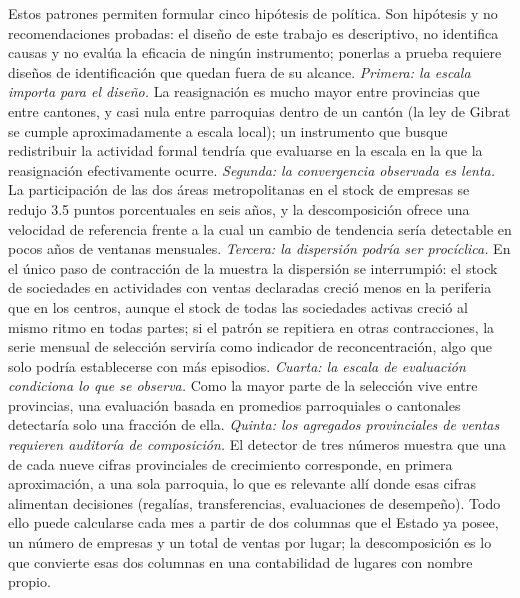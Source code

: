 \documentclass[12pt,a4paper]{article}
\begin{document}
\par\vspace{6pt}
Estos patrones permiten formular cinco hipótesis de política. Son hipótesis y no recomendaciones probadas: el diseño de este trabajo es descriptivo, no identifica causas y no evalúa la eficacia de ningún instrumento; ponerlas a prueba requiere diseños de identificación que quedan fuera de su alcance. \textit{Primera: la escala importa para el diseño.} La reasignación es mucho mayor entre provincias que entre cantones, y casi nula entre parroquias dentro de un cantón (la ley de Gibrat se cumple aproximadamente a escala local); un instrumento que busque redistribuir la actividad formal tendría que evaluarse en la escala en la que la reasignación efectivamente ocurre. \textit{Segunda: la convergencia observada es lenta.} La participación de las dos áreas metropolitanas en el stock de empresas se redujo 3.5 puntos porcentuales en seis años, y la descomposición ofrece una velocidad de referencia frente a la cual un cambio de tendencia sería detectable en pocos años de ventanas mensuales. \textit{Tercera: la dispersión podría ser procíclica.} En el único paso de contracción de la muestra la dispersión se interrumpió: el stock de sociedades en actividades con ventas declaradas creció menos en la periferia que en los centros, aunque el stock de todas las sociedades activas creció al mismo ritmo en todas partes; si el patrón se repitiera en otras contracciones, la serie mensual de selección serviría como indicador de reconcentración, algo que solo podría establecerse con más episodios. \textit{Cuarta: la escala de evaluación condiciona lo que se observa.} Como la mayor parte de la selección vive entre provincias, una evaluación basada en promedios parroquiales o cantonales detectaría solo una fracción de ella. \textit{Quinta: los agregados provinciales de ventas requieren auditoría de composición.} El detector de tres números muestra que una de cada nueve cifras provinciales de crecimiento corresponde, en primera aproximación, a una sola parroquia, lo que es relevante allí donde esas cifras alimentan decisiones (regalías, transferencias, evaluaciones de desempeño). Todo ello puede calcularse cada mes a partir de dos columnas que el Estado ya posee, un número de empresas y un total de ventas por lugar; la descomposición es lo que convierte esas dos columnas en una contabilidad de lugares con nombre propio.
\par\vspace{6pt}
\end{document}
